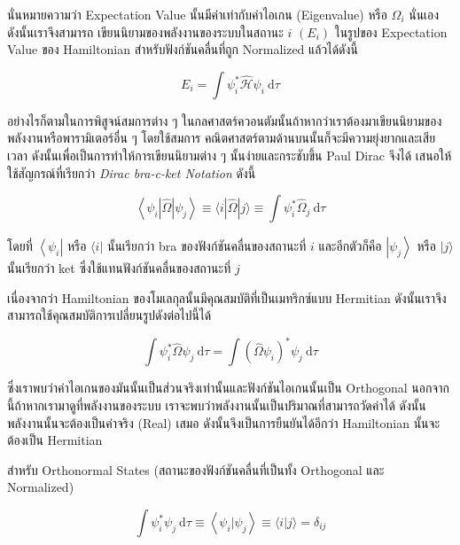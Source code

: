 \noindent นั่นหมายความว่า Expectation Value นั้นมีค่าเท่ากับค่าไอเกน (Eigenvalue) หรือ $\Omega_i$ นั่นเอง ดังนั้นเราจึงสามารถ%
เขียนนิยามของพลังงานของระบบในสถานะ $i$ $(E_i)$ ในรูปของ Expectation Value ของ Hamiltonian สำหรับฟังก์ชันคลื่นที่ถูก
Normalized แล้วได้ดังนี้

\begin{equation}
    E_i = \int \psi_i^* \hat{\mathcal{H}} \psi_i \mathrm{~d} \tau
\end{equation}

อย่างไรก็ตามในการพิสูจน์สมการต่าง ๆ ในกลศาสตร์ควอนตัมนั้นถ้าหากว่าเราต้องมาเขียนนิยามของพลังงานหรือพารามิเตอร์อื่น ๆ โดยใช้สมการ%
คณิตศาสตร์ตามด้านบนนั้นก็จะมีความยุ่งยากและเสียเวลา ดังนั้นเพื่อเป็นการทำให้การเขียนนิยามต่าง ๆ นั้นง่ายและกระชับขึ้น Paul Dirac จึงได้%
เสนอให้ใช้สัญกรณ์ที่เรียกว่า \textit{Dirac bra-c-ket Notation} ดังนี้

\begin{equation}
    \left\langle\psi_i|\hat{\Omega}| \psi_j\right\rangle
    \equiv
    \langle i|\hat{\Omega}| j\rangle
    \equiv
    \int \psi_i^* \hat{\Omega}_j \mathrm{~d} \tau
\end{equation}

\noindent โดยที่ $\left\langle\psi_i\right|$ หรือ $\langle i|$ นั้นเรียกว่า bra ของฟังก์ชันคลื่นของสถานะที่ $i$ และอีกตัวก็คือ
$\left|\psi_j\right\rangle$ หรือ $|j\rangle$ นั้นเรียกว่า ket ซึ่งใช้แทนฟังก์ชันคลื่นของสถานะที่ $j$

เนื่องจากว่า Hamiltonian ของโมเลกุลนั้นมีคุณสมบัติที่เป็นเมทริกซ์แบบ Hermitian ดังนั้นเราจึงสามารถใช้คุณสมบัติการเปลี่ยนรูปดังต่อไปนี้ได้

\begin{equation}
    \int \psi_i^* \hat{\Omega} \psi_j \mathrm{~d} \tau
    =
    \int\left(\hat{\Omega} \psi_i\right)^* \psi_j \mathrm{~d} \tau
\end{equation}

\noindent ซึ่งเราพบว่าค่าไอเกนของมันนั้นเป็นส่วนจริงเท่านั้นและฟังก์ชันไอเกนนั้นเป็น Orthogonal นอกจากนี้ถ้าหากเรามาดูที่พลังงานของระบบ%
เราจะพบว่าพลังงานนั้นเป็นปริมาณที่สามารถวัดค่าได้ ดังนั้นพลังงานนั้นจะต้องเป็นค่าจริง (Real) เสมอ ดังนั้นจึงเป็นการยืนยันได้อีกว่า Hamiltonian
นั้นจะต้องเป็น Hermitian

สำหรับ Orthonormal States (สถานะของฟังก์ชันคลื่นที่เป็นทั้ง Orthogonal และ Normalized)

\begin{equation}
    \int \psi_i^* \psi_j \mathrm{~d} \tau
    \equiv
    \left\langle\psi_i | \psi_j\right\rangle
    \equiv
    \langle i | j\rangle=\delta_{i j}
\end{equation}


